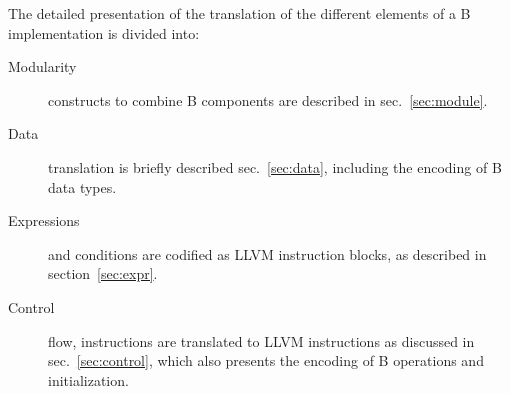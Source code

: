 \documentclass{llncs}
\newcommand{\llvm}[1]{\texttt{#1}}
\newcommand{\B}[1]{\textsf{#1}}
\newcommand{\ListOf}[1]{$\mbox{#1}^+$}
\newcommand{\nt}[1]{{\normalfont\textit{#1}}}
\begin{document}
%
The detailed presentation of the translation of the different elements of a B
implementation is divided into:
\begin{description} %
\item[Modularity] constructs to combine B components are described in
  sec.~\ref{sec:module}.
\item[Data] translation is briefly described sec.~\ref{sec:data}, including
  the encoding of B data types.
\item[Expressions] and conditions are codified as LLVM instruction blocks, as
  described in section~\ref{sec:expr}.
\item[Control] flow, instructions are translated to LLVM instructions as
  discussed in sec.~\ref{sec:control}, which also presents the encoding
  of B operations and initialization.
\end{description}
\end{document}
